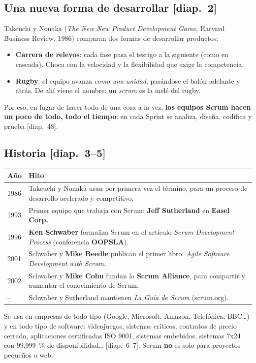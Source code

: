 \documentclass[11pt,a4paper,oneside,openany]{report}
\newcommand{\diap}[1]{\textcolor{mdaPrimary}{\small[diap.~#1]}}
\begin{document}
\subsection{Una nueva forma de desarrollar \diap{2}}
Takeuchi y Nonaka (\emph{The New New Product Development Game}, Harvard Business Review, 1986) comparan dos formas
de desarrollar productos:
\begin{itemize}[leftmargin=*]
  \item \textbf{Carrera de relevos}: cada fase pasa el testigo a la siguiente (como en cascada). Choca con la
        velocidad y la flexibilidad que exige la competencia.
  \item \textbf{Rugby}: el equipo avanza \emph{como una unidad}, pasándose el balón adelante y atrás. De ahí viene el
        nombre: un \emph{scrum} es la melé del rugby.
\end{itemize}
Por eso, en lugar de hacer todo de una cosa a la vez, \textbf{los equipos Scrum hacen un poco de todo, todo el
tiempo}: en cada Sprint se analiza, diseña, codifica y prueba \diap{48}.

\subsection{Historia \diap{3--5}}
\begin{center}\small
\begin{tabular}{lp{11.6cm}}
\toprule
\textbf{Año} & \textbf{Hito} \\ \midrule
1986 & Takeuchi y Nonaka usan por primera vez el término, para un proceso de desarrollo acelerado y competitivo. \\
1993 & Primer equipo que trabaja con Scrum: \textbf{Jeff Sutherland} en \textbf{Easel Corp.} \\
1996 & \textbf{Ken Schwaber} formaliza Scrum en el artículo \emph{Scrum Development Process} (conferencia \textbf{OOPSLA}). \\
2001 & Schwaber y \textbf{Mike Beedle} publican el primer libro: \emph{Agile Software Development with Scrum}. \\
2002 & Schwaber y \textbf{Mike Cohn} fundan la \textbf{Scrum Alliance}, para compartir y aumentar el conocimiento de Scrum. \\
-- & Schwaber y Sutherland mantienen \emph{La Guía de Scrum} (scrum.org). \\
\bottomrule
\end{tabular}
\end{center}
Se usa en empresas de todo tipo (Google, Microsoft, Amazon, Telefónica, BBC…) y en todo tipo de software:
videojuegos, sistemas críticos, contratos de precio cerrado, aplicaciones certificadas ISO 9001, sistemas
embebidos, sistemas 7x24 con 99,999~\% de disponibilidad… \diap{6--7}. Scrum \textbf{no} es solo para proyectos
pequeños o web.
\end{document}
